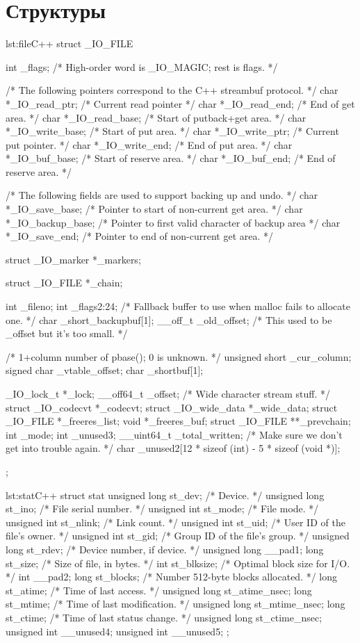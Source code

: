 \section{Структуры}

\begin{listing}{lst:file}{C++}
struct _IO_FILE
{
  int _flags;	/* High-order word is _IO_MAGIC; rest is flags. */

  /* The following pointers correspond to the C++ streambuf protocol. */
  char *_IO_read_ptr;	/* Current read pointer */
  char *_IO_read_end;	/* End of get area. */
  char *_IO_read_base;	/* Start of putback+get area. */
  char *_IO_write_base;	/* Start of put area. */
  char *_IO_write_ptr;	/* Current put pointer. */
  char *_IO_write_end;	/* End of put area. */
  char *_IO_buf_base;	/* Start of reserve area. */
  char *_IO_buf_end;	/* End of reserve area. */

  /* The following fields are used to support backing up and undo. */
  char *_IO_save_base; /* Pointer to start of non-current get area. */
  char *_IO_backup_base;  /* Pointer to first valid character of backup area */
  char *_IO_save_end; /* Pointer to end of non-current get area. */

  struct _IO_marker *_markers;

  struct _IO_FILE *_chain;

  int _fileno;
  int _flags2:24;
  /* Fallback buffer to use when malloc fails to allocate one.  */
  char _short_backupbuf[1];
  __off_t _old_offset; /* This used to be _offset but it's too small.  */

  /* 1+column number of pbase(); 0 is unknown. */
  unsigned short _cur_column;
  signed char _vtable_offset;
  char _shortbuf[1];

  _IO_lock_t *_lock;
  __off64_t _offset;
  /* Wide character stream stuff.  */
  struct _IO_codecvt *_codecvt;
  struct _IO_wide_data *_wide_data;
  struct _IO_FILE *_freeres_list;
  void *_freeres_buf;
  struct _IO_FILE **_prevchain;
  int _mode;
  int _unused3;
  __uint64_t _total_written;
  /* Make sure we don't get into trouble again.  */
  char _unused2[12 * sizeof (int) - 5 * sizeof (void *)];
};

\end{listing}

\begin{listing}{lst:stat}{C++}
struct stat {
	unsigned long	st_dev;		/* Device.  */
	unsigned long	st_ino;		/* File serial number.  */
	unsigned int	st_mode;	/* File mode.  */
	unsigned int	st_nlink;	/* Link count.  */
	unsigned int	st_uid;		/* User ID of the file's owner.  */
	unsigned int	st_gid;		/* Group ID of the file's group. */
	unsigned long	st_rdev;	/* Device number, if device.  */
	unsigned long	__pad1;
	long		st_size;	/* Size of file, in bytes.  */
	int		st_blksize;	/* Optimal block size for I/O.  */
	int		__pad2;
	long		st_blocks;	/* Number 512-byte blocks allocated. */
	long		st_atime;	/* Time of last access.  */
	unsigned long	st_atime_nsec;
	long		st_mtime;	/* Time of last modification.  */
	unsigned long	st_mtime_nsec;
	long		st_ctime;	/* Time of last status change.  */
	unsigned long	st_ctime_nsec;
	unsigned int	__unused4;
	unsigned int	__unused5;
};
\end{listing}